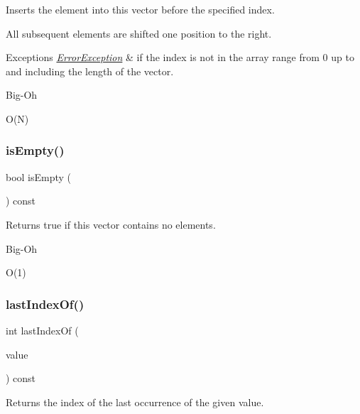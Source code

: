 Inserts the element into this vector before the specified index. 

All subsequent elements are shifted one position to the right. 
\begin{DoxyExceptions}{Exceptions}
{\em \mbox{\hyperlink{classErrorException}{Error\+Exception}}} & if the index is not in the array range from 0 up to and including the length of the vector. \\
\hline
\end{DoxyExceptions}
\begin{DoxyRefDesc}{Big-\/\+Oh}
\item[\mbox{\hyperlink{BigOh__BigOh000116}{Big-\/\+Oh}}]O(\+N) \end{DoxyRefDesc}
\mbox{\label{classVector_acf82f9b2937375c7b1cf3dccb3df3312}} 
\subsubsection{\texorpdfstring{is\+Empty()}{isEmpty()}}
{\footnotesize\ttfamily bool is\+Empty (\begin{DoxyParamCaption}{ }\end{DoxyParamCaption}) const}



Returns {\ttfamily true} if this vector contains no elements. 

\begin{DoxyRefDesc}{Big-\/\+Oh}
\item[\mbox{\hyperlink{BigOh__BigOh000117}{Big-\/\+Oh}}]O(1) \end{DoxyRefDesc}
\mbox{\label{classVector_a48d608a1714954f0a7bcac6459483cb6}} 
\subsubsection{\texorpdfstring{last\+Index\+Of()}{lastIndexOf()}}
{\footnotesize\ttfamily int last\+Index\+Of (\begin{DoxyParamCaption}\item[{const Value\+Type \&}]{value }\end{DoxyParamCaption}) const}



Returns the index of the last occurrence of the given value. 


